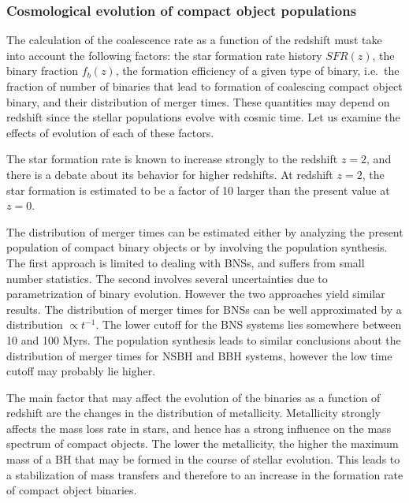 \FloatBarrier
\subsubsection{Cosmological evolution of compact object populations}

The calculation of the coalescence rate as a function of the redshift must take into account the following factors: the star formation rate history $SFR(z)$, the binary fraction $f_b(z)$, the formation efficiency of a given type of binary, i.e.\  the fraction of number of binaries that lead to formation of coalescing compact object binary, and their distribution of merger times. These quantities may depend on redshift since the stellar populations evolve with cosmic time.  Let us examine the effects of  evolution of each of these factors.


The star formation rate is known to increase strongly to the redshift 
$z=2$, and there is a debate about its behavior for higher redshifts. 
At redshift $z=2$, the star formation is estimated to be a factor of 10   
larger \cite{Heavens:2004sr} than the present value at $z=0$. 

The distribution of merger times can be estimated either by analyzing the present population of compact binary objects or by involving the population synthesis. The first approach is limited to dealing with BNSs, and suffers from small number statistics. The second involves several uncertainties due to parametrization of  binary evolution. However the two approaches yield similar results. The distribution of merger times for BNSs can be well approximated by a distribution $\propto t^{-1}$. The lower cutoff for the BNS systems lies somewhere between 10 and 100 Myrs. The population synthesis  leads to similar conclusions about the distribution of merger times for NSBH and BBH systems, however the low time cutoff may probably lie higher.


The main factor that may affect the evolution of the binaries as a function of redshift are the changes in the distribution of metallicity.  Metallicity strongly affects the mass loss rate in stars, and hence has a strong influence on  the mass spectrum of compact objects. The lower the metallicity, the higher the maximum mass of a BH that may be formed in the course of stellar evolution. This leads to a stabilization of mass transfers and therefore to an increase in the formation rate of compact object binaries.


